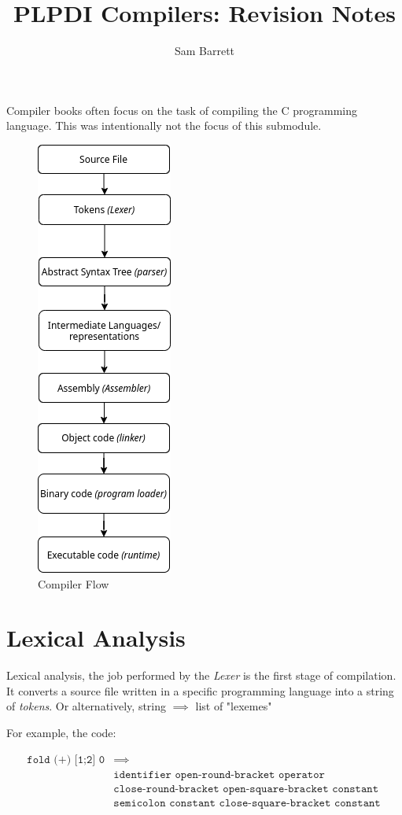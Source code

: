 \documentclass{article}
\title{PLPDI Compilers: Revision Notes}
\author{Sam Barrett}
\renewcommand{\i}[1]{\textit{#1}}
\begin{document}
\maketitle

Compiler books often focus on the task of compiling the C programming language. This was intentionally not the focus of this submodule.

\begin{figure}[htpb]
    \centering
    \includegraphics[width=0.25\linewidth]{CompilerFlow.png}
    \caption{Compiler Flow}%
    \label{fig:compFlow}
\end{figure}
\section{Lexical Analysis}

Lexical analysis, the job performed by the \textit{Lexer} is the first stage of compilation. It converts a source file written in a specific programming language into a string of \i{tokens}. Or alternatively, string $\implies$ list of "lexemes"

For example, the code:


\begin{align*}
    \texttt{fold (+) [1;2] 0} &\implies \\ 
                              &\texttt{identifier open-round-bracket operator } \\ 
                              &\texttt{close-round-bracket open-square-bracket constant } \\ &\texttt{semicolon constant close-square-bracket constant}
\end{align*}
\end{document}
